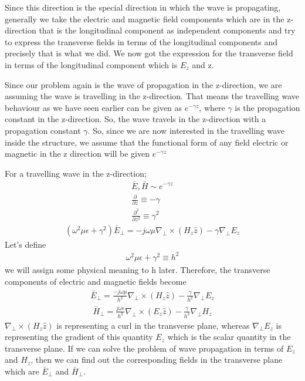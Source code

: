 Since this direction is the special direction in which the wave is propagating, generally we take the electric and magnetic field components which are in the z-direction that is the longitudinal component as independent components and try to express the transverse fields in terms of the longitudinal components and precisely that is what we did. We now got the expression for the transverse field in terms of the longitudinal component which is $E_z$ and z.

Since our problem again is the wave of propagation in the z-direction, we are assuming the wave is travelling in the z-direction. That means the travelling wave behaviour as we have seen earlier can be given as $e^{-\gamma z}$, where $\gamma$ is the propagation constant in the z-direction. So, the wave travels in the z-direction with a propagation constant $\gamma$. So, since we are now interested in the travelling wave inside the structure, we assume that the functional form of any field electric or magnetic in the z direction will be given $e^{-\gamma z}$

For a travelling wave in the z-direction;
\begin{align*}
\bar{E}, \bar{H} \sim e^{-\gamma z}\\
\frac{\partial}{\partial z} \equiv -\gamma\\
\frac{\partial^2}{\partial z^2} \equiv \gamma^2
\end{align*}
\begin{align*}
(\omega^2\mu\epsilon + \gamma^2)\bar{E}_\bot = -j\omega\mu\nabla_\bot\times(H_z\hat{z})-\gamma\nabla_\bot E_z
\end{align*}
Let's define
\begin{align}
\omega^2\mu\epsilon + \gamma^2 \equiv h^2
\label{eqn:h}
\end{align}
we will assign some physical meaning to h later. Therefore, the transverse components of electric and magnetic fields become
\begin{align}
\bar{E}_\bot = \frac{-j\omega\mu}{h^2}\nabla_\bot\times(H_z\hat{z}) - \frac{\gamma}{h^2}\nabla_\bot E_z
\label{eqn:transverseele2}
\end{align}
\begin{align}
\bar{H}_\bot = \frac{j\omega\epsilon}{h^2}\nabla_\bot\times(E_z\hat{z}) - \frac{\gamma}{h^2}\nabla_\bot H_z
\label{eqn:transversemag2}
\end{align}
$\nabla_\bot\times(H_z\hat{z})$ is representing a curl in the transverse plane, whereas $\nabla_\bot E_z$ is representing the gradient of this quantity $E_z$ which is the scalar quantity in the transverse plane. If we can solve the problem of wave propagation in terms of $E_z$ and $H_z$, then we can find out the corresponding fields in the transverse plane which are $\bar{E}_\bot$ and $\bar{H}_\bot$.

